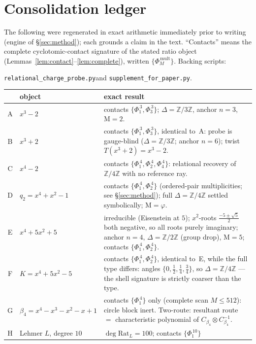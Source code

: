 \documentclass[11pt]{article}
\theoremstyle{plain}
\theoremstyle{definition}
\theoremstyle{remark}
\newcommand{\Z}{\mathbb{Z}}
\newcommand{\Mah}{\mathrm{M}}
\newcommand{\Rat}{\mathrm{Rat}}
\begin{document}
\appendix

\section{Consolidation ledger}\label{app:ledger}

The following were regenerated in exact arithmetic immediately prior to writing
(engine of \S\ref{sec:method}); each grounds a claim in the text. ``Contacts''
means the complete cyclotomic-contact signature of the stated ratio object
(Lemmas~\ref{lem:contact}--\ref{lem:complete}), written
$\{\Phi_{M}^{\,\mathrm{mult}}\}$. Backing scripts:\\
\centerline{\texttt{relational\_charge\_probe.py}\quad and\quad
\texttt{supplement\_for\_paper.py}.}

\begin{center}
\small
\begin{tabular}{clp{9.2cm}}
\hline
 & object & exact result\\
\hline
A & $x^3-2$ & contacts $\{\Phi_1^{\,3},\Phi_3^{\,3}\}$; $\Delta=\Z/3\Z$, anchor
$n=3$, $\Mah=2$.\\[2pt]
B & $x^3+2$ & contacts $\{\Phi_1^{\,3},\Phi_3^{\,3}\}$, identical to~A: probe is
gauge-blind ($\Delta=\Z/3\Z$; anchor $n=6$); twist $T(x^3+2)=x^3-2$.\\[2pt]
C & $x^4-2$ & contacts $\{\Phi_1^{\,4},\Phi_2^{\,4},\Phi_4^{\,4}\}$: relational
recovery of $\Z/4\Z$ with no reference ray.\\[2pt]
D & $q_2=x^4+x^2-1$ & contacts $\{\Phi_1^{\,4},\Phi_2^{\,4}\}$ (ordered-pair
multiplicities; see \S\ref{sec:method}); full $\Delta=\Z/4\Z$ settled
symbolically; $\Mah=\varphi$.\\[2pt]
E & $x^4+5x^2+5$ & irreducible (Eisenstein at $5$); $x^2$-roots
$\frac{-5\pm\sqrt5}{2}$ both negative, so all roots purely imaginary; anchor
$n=4$, $\Delta=\Z/2\Z$ (group drop), $\Mah=5$; contacts
$\{\Phi_1^{\,4},\Phi_2^{\,4}\}$.\\[2pt]
F & $K=x^4+5x^2-5$ & contacts $\{\Phi_1^{\,4},\Phi_2^{\,4}\}$, identical to~E,
while the full type differs: angles $\{0,\tfrac12,\tfrac14,\tfrac34\}$, so
$\Delta=\Z/4\Z$ --- the shell signature is strictly coarser than the type.\\[2pt]
G & $\beta_4=x^4-x^3-x^2-x+1$ & contacts $\{\Phi_1^{\,4}\}$ only (complete scan
$M\le512$): circle block inert. Two-route: resultant route $=$ characteristic
polynomial of $C_{\beta_4}\otimes C_{\beta_4}^{-1}$.\\[2pt]
H & Lehmer $L$, degree $10$ & $\deg\Rat_L=100$; contacts $\{\Phi_1^{\,10}\}$

\end{tabular}
\end{center}
\end{document}
